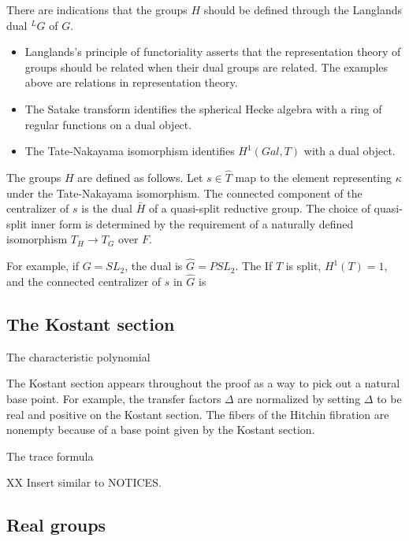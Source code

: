 \documentclass[brochure,english,12pt]{bourbaki}
\begin{document}
There are indications that the groups $H$ should be defined through  
the Langlands dual ${}^LG$ of $G$.
\begin{itemize}
\item Langlands's principle of functoriality asserts that the representation
theory of groups should be related when their dual groups are related.  The examples above are relations in representation theory.
\item The Satake transform identifies the spherical Hecke algebra with a ring of regular functions on a dual object.
\item The Tate-Nakayama isomorphism identifies $H^1(Gal,T)$
with a dual object.
\end{itemize}

The groups $H$ are defined as follows.  Let $s\in \hat T$ map
to the element representing $\kappa$ under the Tate-Nakayama isomorphism.
The connected component of the centralizer of $s$ is the dual $\bar H$
of a quasi-split reductive group.  The choice of
quasi-split inner form is determined by the requirement of a naturally
defined isomorphism $T_H\to T_G$ over $F$.

For example, if $G=SL_2$, the dual is $\hat G = PSL_2$.  The
If $T$ is split, $H^1(T)=1$, and the connected centralizer of $s$ in $\hat G$ is 

\subsection{The Kostant section}

The characteristic polynomial

The Kostant section appears throughout the proof as a way to pick
out a natural base point.  For example, the transfer factors $\Delta$
are normalized by setting $\Delta$ to be real and positive on the
Kostant section.  The fibers of the Hitchin fibration are nonempty
because of a base point given by the Kostant section. 

The trace formula

XX Insert similar to NOTICES.

\subsection{Real groups}
\end{document}
